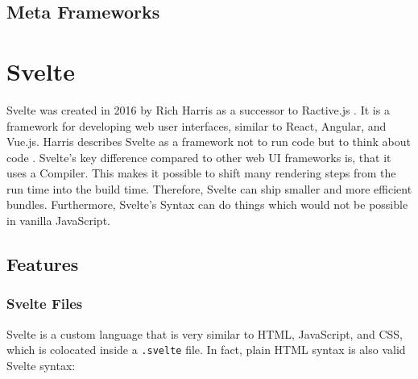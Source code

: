 \subsection{Meta Frameworks}

\section{Svelte}
\label{sec:svelte}

% 
% 
% 
% 

Svelte was created in 2016 by Rich Harris as a successor to Ractive.js \cite{offerzen_origins_svelte_2022}. It is a framework for developing web user interfaces, similar to React, Angular, and Vue.js. Harris describes Svelte as a framework not to run code but to think about code \cite{offerzen_origins_svelte_2022}. Svelte's key difference compared to other web UI frameworks is, that it uses a Compiler. This makes it possible to shift many rendering steps from the run time into the build time. Therefore, Svelte can ship smaller and more efficient bundles. Furthermore, Svelte's Syntax can do things which would not be possible in vanilla JavaScript.

\subsection{Features}

\subsubsection{Svelte Files}

Svelte is a custom language that is very similar to HTML, JavaScript, and CSS, which is colocated inside a \texttt{.svelte} file. In fact, plain HTML syntax is also valid Svelte syntax:

